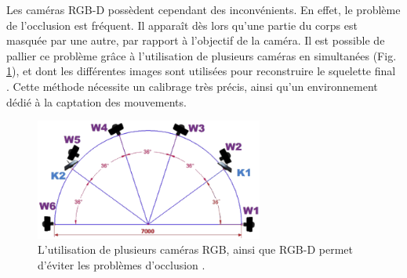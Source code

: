 Les caméras RGB-D possèdent cependant des inconvénients. En effet, le problème de l'occlusion est fréquent. Il apparaît dès lors qu'une partie du corps est masquée par une autre, par rapport à l'objectif de la caméra. Il est possible de pallier ce problème grâce à l'utilisation de plusieurs caméras en simultanées (Fig. \ref{fig:multiple_rgb_d_camera_system}), et dont les différentes images sont utilisées pour reconstruire le squelette final \parencite{Regazzoni2014Rcv}. Cette méthode nécessite un calibrage très précis, ainsi qu'un environnement dédié à la captation des mouvements.\\

\begin{figure}[h]
    \centering
    \includegraphics[width=7.5cm]{pictures/multiple_rgb_d_camera_system.png}
    \caption[utilisation de multiples caméras RGB et RGB-B pour éviter l'occlusion \parencite{Regazzoni2014Rcv}]{L'utilisation de plusieurs caméras RGB, ainsi que RGB-D permet d'éviter les problèmes d'occlusion \parencite{Regazzoni2014Rcv}.}
    \label{fig:multiple_rgb_d_camera_system}
\end{figure}

